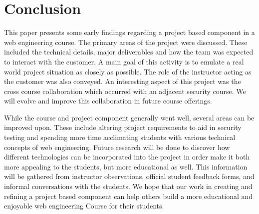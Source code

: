 \documentclass[conference]{IEEEtran}
\begin{document}
\section{Conclusion}

This paper presents some early findings regarding a project based component in a web engineering course. The primary areas of the project were discussed. These included the technical details, major deliverables and how the team was expected to interact with the customer. A main goal of this activity is to emulate a real world project situation as closely as possible. The role of the instructor acting as the customer was also conveyed. An interesting aspect of this project was the cross course collaboration which occurred with an adjacent security course. We will evolve and improve this collaboration in future course offerings.

While the course and project component generally went well, several areas can be improved upon. These include altering project requirements to aid in security testing and spending more time acclimating students with various technical concepts of web engineering. Future research will be done to discover how different technologies can be incorporated into the project in order make it both more appealing to the students, but more educational as well. This information will be gathered from instructor observations, official student feedback forms, and informal conversations with the students. We hope that our work in creating and refining a project based component can help others build a more educational and enjoyable web engineering Course for their students.





\end{document}
